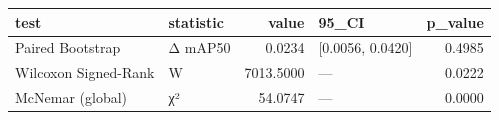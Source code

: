 \begin{tabular}{llrlr}
\toprule
test & statistic & value & 95_CI & p_value \\
\midrule
Paired Bootstrap & Δ mAP50 & 0.0234 & [0.0056, 0.0420] & 0.4985 \\
Wilcoxon Signed-Rank & W & 7013.5000 & — & 0.0222 \\
McNemar (global) & χ² & 54.0747 & — & 0.0000 \\
\bottomrule
\end{tabular}
